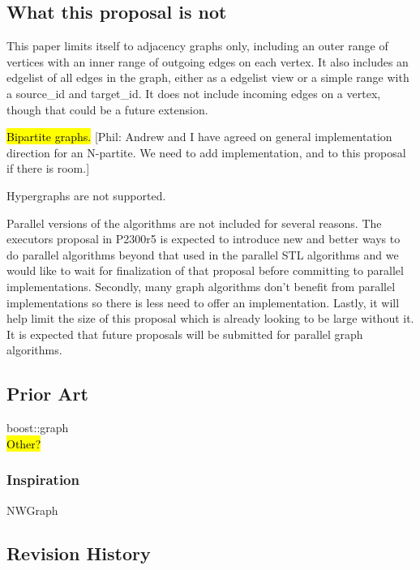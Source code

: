 \documentclass[10pt,onecolumn]{article}
\newcommand{\comment}[2]{{\color{comment}[{\sc #1:} \textsf{#2}]}}
\newcommand{\phil}[1]{\comment{Phil}{#1}}
\begin{document}
\subsection{What this proposal is  \textbf{not}}
This paper limits itself to adjacency graphs only, including an outer range of vertices with an inner range of outgoing edges on each vertex. It also includes an edgelist of all edges in the graph, either as a edgelist view or a simple range with a source\_id and target\_id. It does not include incoming edges on a vertex, though that could be a future extension.

\hl{Bipartite graphs.} 
\phil{Andrew and I have agreed on general implementation direction for an N-partite. We need to add implementation, and to this proposal if there is room.}

Hypergraphs are not supported.

Parallel versions of the algorithms are not included for several reasons. The executors proposal in P2300r5 \cite{REF_P2300r5} is expected to introduce new and better ways to do parallel algorithms beyond that used in the parallel STL algorithms and we would like to wait for finalization of that proposal before committing to parallel implementations. Secondly, many graph algorithms don't benefit from parallel implementations so there is less need to offer an implementation. Lastly, it will help limit the size of this proposal which is already looking to be large without it. It is expected that future proposals will be submitted for parallel graph algorithms. 

\subsection{Prior Art}
boost::graph \\
\hl{Other?}

\subsubsection{Inspiration}
NWGraph

\subsection{Revision History}
\end{document}

